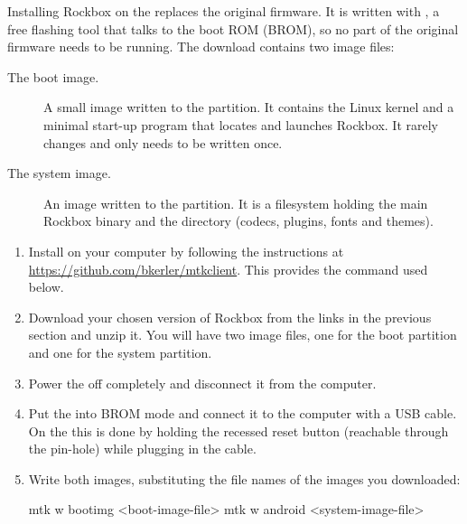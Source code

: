 
Installing Rockbox on the \playertype{} replaces the original firmware. It is
written with , a free flashing tool that talks to the
\daps{} boot ROM (BROM), so no part of the original firmware needs to be
running. The download contains two image files:

\begin{description}
\item[The boot image.] A small image written to the  partition.
  It contains the Linux kernel and a minimal start-up program that locates and
  launches Rockbox. It rarely changes and only needs to be written once.
\item[The system image.] An image written to the  partition. It
  is a filesystem holding the main Rockbox binary and the 
  directory (codecs, plugins, fonts and themes).
\end{description}


\begin{enumerate}
\item Install  on your computer by following the instructions
  at \url{https://github.com/bkerler/mtkclient}. This provides the 
  command used below.

\item Download your chosen version of Rockbox from the links in the previous
  section and unzip it. You will have two image files, one for the boot
  partition and one for the system partition.

\item Power the \dap{} off completely and disconnect it from the computer.

\item Put the \dap{} into BROM mode and connect it to the computer with a USB
  cable. On the \playertype{} this is done by holding the recessed reset
  button (reachable through the pin-hole) while plugging in the cable.

\item Write both images, substituting the file names of the images you
  downloaded:
\begin{code}
    mtk w bootimg <boot-image-file>
    mtk w android <system-image-file>
\end{code}
\end{enumerate}
